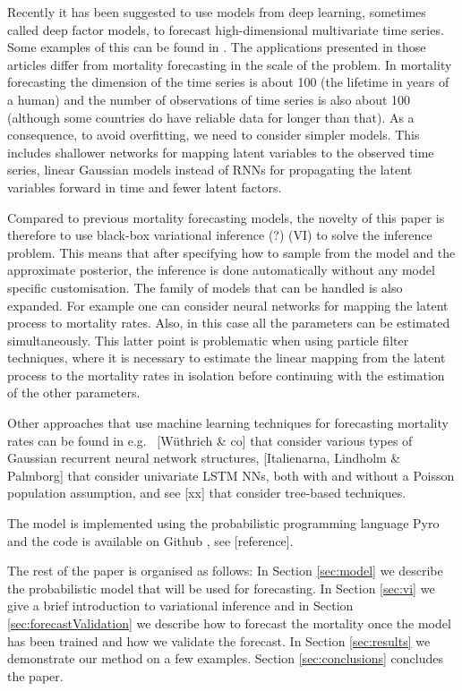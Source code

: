 \documentclass[preprint,12pt]{elsarticle}
\newcommand{\ml}[1]{{\color{red} #1}}
\newcommand{\lpa}[1]{{\color{blue} #1}}
\begin{document}
\lpa{Recently it has been suggested to use models from deep learning, sometimes called deep factor models, to forecast high-dimensional multivariate time series. Some examples of this can be found in \cite{nguyen2021temporal, wang2019deep, salinas2020deepar, rangapuram2018deep}. The applications presented in those articles differ from mortality forecasting in the scale of the problem. In mortality forecasting the dimension of the time series is about 100 (the lifetime in years of a human) and the number of observations of time series is also about 100 (although some countries do have reliable data for longer than that). As a consequence, to avoid overfitting, we need to consider simpler models. This includes shallower networks for mapping latent variables to the observed time series, linear Gaussian models instead of RNNs for propagating the latent variables forward in time and fewer latent factors.}

\lpa{Compared to previous mortality forecasting models, the novelty of this paper is therefore} to use black-box \ml{variational inference (?) (VI)} \citep{ranganath2014black} to solve the inference problem. This means that after specifying how to sample from the model and the approximate posterior, the inference is done automatically without any model specific customisation. The family of models that can be handled is also expanded. For example one can consider neural networks for mapping the latent process to mortality rates. Also, in this case all the parameters can be estimated simultaneously. This latter point is problematic when using particle filter techniques, where it is necessary to estimate the linear mapping from the latent process to the mortality rates in isolation before continuing with the estimation of the other parameters.

Other approaches that use machine learning techniques for forecasting mortality rates can be found in e.g.\ \ml{[W{\"u}thrich \& co]} that consider various types of Gaussian recurrent neural network structures, \ml{[Italienarna, Lindholm \& Palmborg]} that consider univariate LSTM NNs, both with and without a Poisson population assumption, and see \ml{[xx]} that consider tree-based techniques.

The model is implemented using the probabilistic programming language Pyro \citep{bingham2018pyro} and the code is available on Github\ml{, see [reference]}.

The rest of the paper is organised as follows: In Section \ref{sec:model} we describe the probabilistic model that will be used for forecasting. In Section \ref{sec:vi} we give a brief introduction to variational inference and in Section \ref{sec:forecastValidation} we describe how to forecast the mortality once the model has been trained and how we validate the forecast. In Section \ref{sec:results} we demonstrate our method on a few examples. Section \ref{sec:conclusions} concludes the paper.
\end{document}

